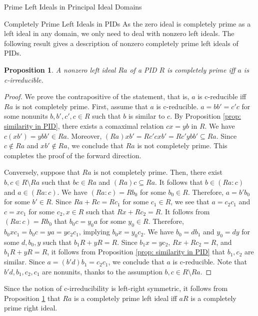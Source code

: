 \documentclass[11pt,a4paper]{article}
\theoremstyle{theorem}
\newtheorem{proposition}[theorem]{Proposition}
\numberwithin{equation}{section}
\begin{document}
\begin{section}{Prime Left Ideals in Principal Ideal Domains}
\begin{subsection}{Completely Prime Left Ideals in PIDs }
		As the zero ideal is completely prime as a left ideal in any domain, we only need to deal with nonzero left ideals. The following result gives a description of nonzero completely prime left ideals of PIDs. 
		\begin{proposition}\label{prop: completely prime ideal of PID}
			A nonzero left ideal \(Ra\) of a PID \(R \) is completely prime iff  \( a \) is  c-irreducible.
		\end{proposition}
		\begin{proof}
			We prove the contrapositive of the statement, that is, \( a \) is  c-reducible iff \(Ra\) is not completely prime. First,
			assume that \(a\) is c-reducible. \(a = bb' = c'c\) for some nonunits \(b,b',c',c\in R\) such that \(b\) is similar to \(c\).   By Proposition \ref{prop: similarity in PID},  there exists a comaximal relation \(c x = y b\) in \(R\). We have \(c(xb') = ybb'\in Ra\). Moreover, \((Ra)xb'=Rc'cxb'=Rc'ybb'\subseteq Ra\). Since \(c\notin Ra\) and \(xb'\notin Ra\), we conclude that \(Ra\) is not completely prime. This completes the proof of the forward direction. 
			
			Conversely, suppose that \(Ra\) is not completely prime. Then, there exist \(b,c\in R\setminus Ra\) such that \(bc\in Ra\) and \((Ra)c\subseteq Ra\). It follows that \(b\in (Ra:c)\) and \(a\in (Ra:c)\). We have \((Ra:c) = Rb_0\) for some \(b_0\in R\). Therefore, \(a = b'b_0 \)  for some \(b'\in R\). Since \(Ra+Rc = Rc_1\) for some \(c_1\in R\), we see that \(a=c_2c_1\) and  \(c=x c_1\) for some \(c_2,x\in R \) such that \(Rx+Rc_2=R\). It follows from \((Ra:c) = Rb_0\) that \(b_0c = y_0 a \) for some \(y_0\in R\). Therefore,  \(b_0xc_1 = b_0c =  y a = y c_2c_1 \), implying \(b_0x=y_0c_2\). We have \(b_0 = d b_1\) and \(y_0 = d y\) for some \(d,b_0,y\) such that \(b_1R+yR=R\). Since \(b_1x = y c_2 \), \(Rx+Rc_2=R\), and \(b_1R+yR=R\), it follows from Proposition \ref{prop: similarity in PID} that \(b_1,c_2\) are similar. Since \(a = (b'd)b_1 = c_2c_1\), we conclude that \(a\) is c-reducible. Note that \(b'd,b_1,c_2,c_1\) are nonunits, thanks to the assumption \(b,c\in R\setminus Ra\). 
		\end{proof}
		Since the notion of c-irreducibility is left-right symmetric, it follows from Proposition \ref{prop: completely prime ideal of PID} that \(Ra\) is a completely prime left ideal iff \(aR\) is a completely prime right ideal. 
		

\end{subsection}
\end{section}
\end{document}
